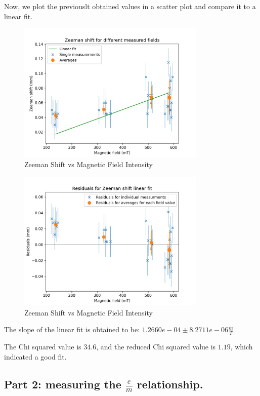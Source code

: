 Now, we plot the previouslt obtained values in a scatter plot and compare it to a linear fit.

\begin{figure}
    \centering
    \includegraphics[width=0.8\textwidth]{Results/img/zeeman_shift_scatter.png}
    \caption{Zeeman Shift vs Magnetic Field Intensity}
\end{figure}

\begin{figure}
    \centering
    \includegraphics[width=0.8\textwidth]{Results/img/zeeman_shift_residuals.png}
    \caption{Zeeman Shift vs Magnetic Field Intensity}
\end{figure}

The slope of the linear fit is obtained to be:
$1.2660e-04 \pm 8.2711e-06 \frac{m}{T}$

The Chi squared value is $34.6$, and the reduced Chi squared value is $1.19$, which indicated a good fit.

\subsection{Part 2: measuring the $\frac{e}{m}$ relationship.}


